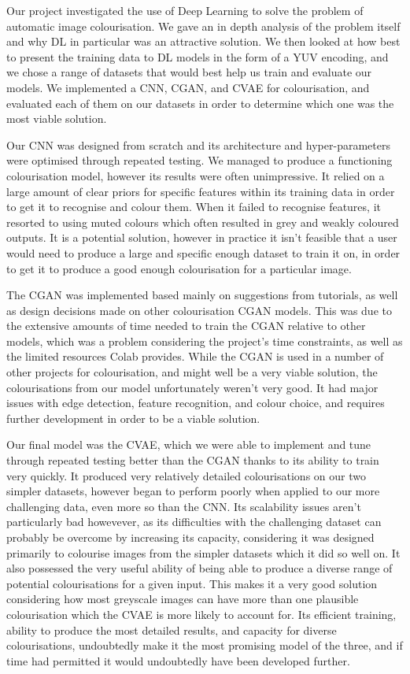 \documentclass{l4proj}
\begin{document}
Our project investigated the use of Deep Learning to solve the problem of automatic image colourisation. We gave an in depth analysis of the problem itself and why DL in particular was an attractive solution. We then looked at how best to present the training data to DL models in the form of a YUV encoding, and we chose a range of datasets that would best help us train and evaluate our models. We implemented a CNN, CGAN, and CVAE for colourisation, and evaluated each of them on our datasets in order to determine which one was the most viable solution. 

Our CNN was designed from scratch and its architecture and hyper-parameters were optimised through repeated testing. We managed to produce a functioning colourisation model, however its results were often unimpressive. It relied on a large amount of clear priors for specific features within its training data in order to get it to recognise and colour them. When it failed to recognise features, it resorted to using muted colours which often resulted in grey and weakly coloured outputs. It is a potential solution, however in practice it isn't feasible that a user would need to produce a large and specific enough dataset to train it on, in order to get it to produce a good enough colourisation for a particular image.

The CGAN was implemented based mainly on suggestions from tutorials, as well as design decisions made on other colourisation CGAN models. This was due to the extensive amounts of time needed to train the CGAN relative to other models, which was a problem considering the project's time constraints, as well as the limited resources Colab provides. While the CGAN is used in a number of other projects for colourisation, and might well be a very viable solution, the colourisations from our model unfortunately weren't very good. It had major issues with edge detection, feature recognition, and colour choice, and requires further development in order to be a viable solution.

Our final model was the CVAE, which we were able to implement and tune through repeated testing better than the CGAN thanks to its ability to train very quickly. It produced very relatively detailed colourisations on our two simpler datasets, however began to perform poorly when applied to our more challenging data, even more so than the CNN. Its scalability issues aren't particularly bad howevever, as its difficulties with the challenging dataset can probably be overcome by increasing its capacity, considering it was designed primarily to colourise images from the simpler datasets which it did so well on. It also possessed the very useful ability of being able to produce a diverse range of potential colourisations for a given input. This makes it a very good solution considering how most greyscale images can have more than one plausible colourisation which the CVAE is more likely to account for. Its efficient training, ability to produce the most detailed results, and capacity for diverse colourisations, undoubtedly make it the most promising model of the three, and if time had permitted it would undoubtedly have been developed further.
\end{document}
